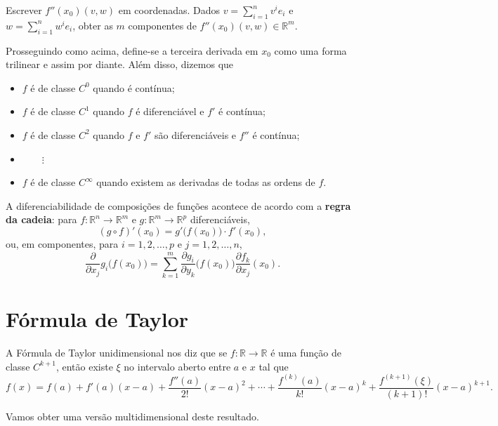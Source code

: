 \begin{exer}
	Escrever $f''(x_0) (v,w)$ em coordenadas. Dados $v = \sum_{i=1}^n v^i e_i$ e $w = \sum_{i=1}^n w^i e_i$, obter as $m$ componentes de $f''(x_0) (v,w) \in \mathbb{R}^m$.
\end{exer}


Prosseguindo como acima, define-se a terceira derivada em $x_0$ como uma forma trilinear e assim por diante. Além disso, dizemos que 
\begin{itemize}
	\item $f$ é de classe $C^0$ quando é contínua;
	
	\item $f$ é de classe $C^1$ quando $f$ é diferenciável e $f'$ é contínua;
	
	\item $f$ é de classe $C^2$ quando $f$ e $f'$ são diferenciáveis e $f''$ é contínua;
	
	\item[] $\qquad \vdots$
	
	\item $f$ é de classe $C^{\infty}$ quando existem as derivadas de todas as ordens de $f$.
\end{itemize}


A diferenciabilidade de composições de funções acontece de acordo com a \textbf{regra da cadeia}: para $f: \mathbb{R}^n \to \mathbb{R}^m$ e $g: \mathbb{R}^m \to \mathbb{R}^p$ diferenciáveis,
\[
(g \circ f)' (x_0) = g' \big( f(x_0) \big) \cdot f'(x_0),
\] ou, em componentes, para $i = 1,2, \dots, p$ e $j = 1, 2, \dots, n$,
\[
\frac{\partial}{\partial x_j} g_i \big( f(x_0) \big) = \sum_{k=1}^{m} \frac{\partial g_i}{\partial y_k}\big( f(x_0) \big) \frac{\partial f_k}{\partial x_j} (x_0).
\]






\section{Fórmula de Taylor}


A Fórmula de Taylor unidimensional nos diz que se $f: \mathbb{R} \to \mathbb{R}$ é uma função de classe $C^{k+1}$, então existe $\xi$ no intervalo aberto entre $a$ e $x$ tal que
\[
f(x) = f(a) + f'(a) (x-a) + \frac{f''(a)}{2!} (x-a)^2 + \cdots + \frac{f^{(k)}(a)}{k!} (x-a)^k + \frac{f^{(k+1)}(\xi)}{(k+1)!} (x-a)^{k+1}.
\]

Vamos obter uma versão multidimensional deste resultado. 

